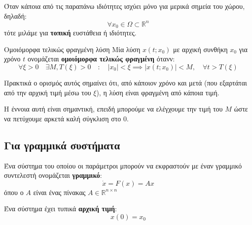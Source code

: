 \documentclass[11pt,a4paper,notitlepage,fleqn]{article}
\begin{document}
Όταν κάποια από τις παραπάνω ιδιότητες ισχύει μόνο για μερικά σημεία του χώρου, δηλαδή:
\[
\forall x_0 \in \Omega \subset \mathbb R^n
\]
τότε μιλάμε για \textbf{τοπική} ευστάθεια ή ιδιότητες.

\begin{defn}{Ομοιόμορφα τελικώς φραγμένη λύση}{}
	Μία λύση \( x(t;x_0) \) με αρχική συνθήκη \( x_0 \) για χρόνο \( t \) ονομάζεται
	\textbf{ομοιόμορφα τελικώς φραγμένη} ότανν:
	\[
	\forall \xi > 0 \quad
	\exists M,T(\xi) > 0
	\quad : \quad
	\left|x_0\right| < \xi \implies \left|
	x(t;x_0)\right| < M
	, \quad \forall t > T(\xi)
	\]
\end{defn}
Πρακτικά ο ορισμός αυτός σημαίνει ότι, από κάποιον χρόνο και μετά (που
εξαρτάται από την αρχική τιμή μέσω του \( \xi \)), η λύση είναι φραγμένη
από κάποια τιμή.


Η έννοια αυτή είναι σημαντική, επειδή μπορούμε να ελέγχουμε την τιμή του \( M \) ώστε να
πετύχουμε αρκετά καλή σύγκλιση στο 0.


\subsection{Για γραμμικά συστήματα}
\label{sec:linear_stability}
Ένα σύστημα του οποίου οι παράμετροι μπορούν να εκφραστούν με έναν γραμμικό
συντελεστή ονομάζεται \textbf{γραμμικό}:
\[
\dot x = F(x) = Ax
\] όπου ο \( A \) είναι ένας πίνακας \( A \in \mathbb R^{n\times n} \)

Ένα σύστημα έχει τυπικά \textbf{αρχική τιμή}:
\[
x(0) = x_0
\]
\end{document}

